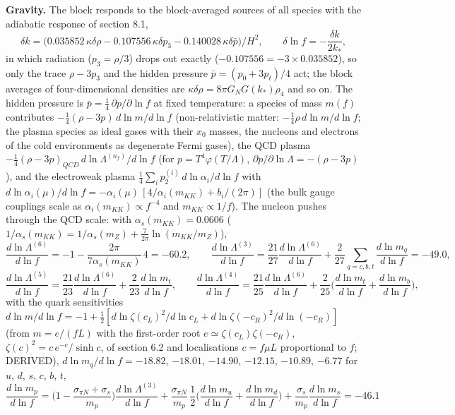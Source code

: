 \documentclass[
  10pt,
]{article}
\begin{document}
\textbf{Gravity.} The block responds to the block-averaged sources of
all species with the adiabatic response of section 8.1,
\[ \delta k = \big(0.035852\,\kappa\delta\rho - 0.107556\,\kappa\delta p_3 - 0.140028\,\kappa\delta\bar p\big)/H^2,\qquad \delta\ln f = -\frac{\delta k}{2k_*}, \]
in which radiation (\(p_3 = \rho/3\)) drops out exactly
(\(-0.107556 = -3\times0.035852\)), so only the trace \(\rho - 3p_3\)
and the hidden pressure \(\bar p = (p_0 + 3p_t)/4\) act; the block
averages of four-dimensional densities are
\(\kappa\delta\rho = 8\pi G_NG(k_*)\rho_4\) and so on. The hidden
pressure is \(\bar p = \frac14\,\partial p/\partial\ln f\) at fixed
temperature: a species of mass \(m(f)\) contributes
\(-\frac14(\rho - 3p)\,d\ln m/d\ln f\) (non-relativistic matter:
\(-\frac14\rho\,d\ln m/d\ln f\); the plasma species as ideal gases with
their \(x_0\) masses, the nucleons and electrons of the cold
environments as degenerate Fermi gases), the QCD plasma
\(-\frac14(\rho - 3p)_{QCD}\,d\ln\Lambda^{(n_f)}/d\ln f\) (for
\(p = T^4\varphi(T/\Lambda)\),
\(\partial p/\partial\ln\Lambda = -(\rho - 3p)\)), and the electroweak
plasma \(\frac14\sum_ip_2^{(i)}\,d\ln\alpha_i/d\ln f\) with
\(d\ln\alpha_i(\mu)/d\ln f = -\alpha_i(\mu)\,[4/\alpha_i(m_{KK}) + b_i/(2\pi)]\)
(the bulk gauge couplings scale as \(\alpha_i(m_{KK}) \propto f^{-4}\)
and \(m_{KK} \propto 1/f\)). The nucleon pushes through the QCD scale:
with \(\alpha_s(m_{KK}) = 0.0606\)
(\(1/\alpha_s(m_{KK}) = 1/\alpha_s(m_Z) + \frac{7}{2\pi}\ln(m_{KK}/m_Z)\)),
\[ \frac{d\ln\Lambda^{(6)}}{d\ln f} = -1 - \frac{2\pi}{7\alpha_s(m_{KK})}\,4 = -60.2,\qquad \frac{d\ln\Lambda^{(3)}}{d\ln f} = \frac{21}{27}\frac{d\ln\Lambda^{(6)}}{d\ln f} + \frac{2}{27}\sum_{q = c,b,t}\frac{d\ln m_q}{d\ln f} = -49.0,\]
\[ \frac{d\ln\Lambda^{(5)}}{d\ln f} = \frac{21}{23}\frac{d\ln\Lambda^{(6)}}{d\ln f} + \frac{2}{23}\frac{d\ln m_t}{d\ln f},\qquad \frac{d\ln\Lambda^{(4)}}{d\ln f} = \frac{21}{25}\frac{d\ln\Lambda^{(6)}}{d\ln f} + \frac{2}{25}\Big(\frac{d\ln m_t}{d\ln f} + \frac{d\ln m_b}{d\ln f}\Big),\]
with the quark sensitivities
\(d\ln m/d\ln f = -1 + \frac12[d\ln\zeta(c_L)^2/d\ln c_L + d\ln\zeta(-c_R)^2/d\ln(-c_R)]\)
(from \(m = e/(fL)\) with the first-order root
\(e \simeq \zeta(c_L)\zeta(-c_R)\), \(\zeta(c)^2 = c\,e^{-c}/\sinh c\),
of section 6.2 and localisations \(c = f\mu L\) proportional to \(f\);
DERIVED), \(d\ln m_q/d\ln f = -18.82\), \(-18.01\), \(-14.90\),
\(-12.15\), \(-10.89\), \(-6.77\) for \(u\), \(d\), \(s\), \(c\), \(b\),
\(t\),
\[ \frac{d\ln m_p}{d\ln f} = \Big(1 - \frac{\sigma_{\pi N} + \sigma_s}{m_p}\Big)\frac{d\ln\Lambda^{(3)}}{d\ln f} + \frac{\sigma_{\pi N}}{m_p}\,\frac12\Big(\frac{d\ln m_u}{d\ln f} + \frac{d\ln m_d}{d\ln f}\Big) + \frac{\sigma_s}{m_p}\frac{d\ln m_s}{d\ln f} = -46.1 \]
\end{document}
